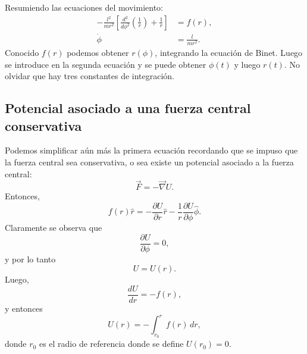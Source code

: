\documentclass[../apunte_mecanica_clasica.tex]{subfiles}%
\begin{document}
Resumiendo las ecuaciones del movimiento:
\begin{align}
    -\frac{l^2}{mr^2}\left[\frac{d^2}{d\phi^2}\left(\frac{1}{r}\right)+\frac{1}{r}\right]&=f(r),
    \label{eq:fcbk-binet-resumen}\\
    \dot\phi&=\frac{l}{mr^2}.
    \label{eq:fcbk-phidot-resumen}
\end{align}
Conocido $f(r)$ podemos obtener $r(\phi)$, integrando la ecuación de Binet. Luego se introduce en la segunda ecuación y se puede obtener $\phi(t)$ y luego $r(t)$. No olvidar que hay tres constantes de integración.

\subsection{Potencial asociado a una fuerza central conservativa}

Podemos simplificar aún más la primera ecuación recordando que se impuso que la fuerza central sea conservativa, o sea existe un potencial asociado a la fuerza central:
\begin{equation}
    \vec F=-\vec\nabla U.
    \label{eq:fcbk-fuerza-potencial}
\end{equation}
Entonces,
\begin{equation}
    f(r)\hat r=-\frac{\partial U}{\partial r}\hat r-\frac{1}{r}\frac{\partial U}{\partial \phi}\hat\phi.
    \label{eq:fcbk-potencial-cilindrico}
\end{equation}
Claramente se observa que
\begin{equation}
    \frac{\partial U}{\partial \phi}=0,
    \label{eq:fcbk-U-no-depende-phi}
\end{equation}
y por lo tanto
\begin{equation}
    U=U(r).
    \label{eq:fcbk-U-de-r}
\end{equation}
Luego,
\begin{equation}
    \frac{dU}{dr}=-f(r),
    \label{eq:fcbk-dUdr}
\end{equation}
y entonces
\begin{equation}
    U(r)=-\int_{r_0}^{r}f(r)\,dr,
    \label{eq:fcbk-U-integral}
\end{equation}
donde $r_0$ es el radio de referencia donde se define $U(r_0)=0$.
\end{document}
